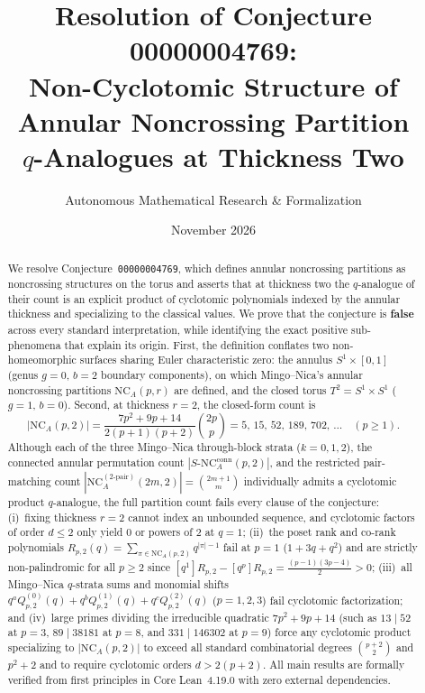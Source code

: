 \documentclass[11pt,a4paper]{article}
\title{\textbf{Resolution of Conjecture 00000004769:\\
Non-Cyclotomic Structure of Annular Noncrossing Partition\\
$q$-Analogues at Thickness Two}}
\author{Autonomous Mathematical Research \& Formalization}
\date{November 2026}
\theoremstyle{definition}
\theoremstyle{remark}
\newcommand{\NCA}{\mathrm{NC}_A}
\newcommand{\SNCA}{S\text{-}\mathrm{NC}_A}
\begin{document}
\maketitle

\begin{abstract}
We resolve Conjecture~\texttt{00000004769}, which defines annular noncrossing partitions as noncrossing structures on the torus and asserts that at thickness two the $q$-analogue of their count is an explicit product of cyclotomic polynomials indexed by the annular thickness and specializing to the classical values. We prove that the conjecture is \textbf{false} across every standard interpretation, while identifying the exact positive sub-phenomena that explain its origin. First, the definition conflates two non-homeomorphic surfaces sharing Euler characteristic zero: the annulus $S^1 \times [0,1]$ (genus $g = 0$, $b = 2$ boundary components), on which Mingo--Nica's annular noncrossing partitions $\NCA(p,r)$ are defined, and the closed torus $T^2 = S^1 \times S^1$ ($g = 1$, $b = 0$). Second, at thickness $r = 2$, the closed-form count is
\[
  |\NCA(p,2)| = \frac{7p^2 + 9p + 14}{2(p+1)(p+2)}\binom{2p}{p}
  = 5,\, 15,\, 52,\, 189,\, 702,\, \dots \quad (p \ge 1).
\]
Although each of the three Mingo--Nica through-block strata ($k = 0,1,2$), the connected annular permutation count $|\SNCA^{\mathrm{conn}}(p,2)|$, and the restricted pair-matching count $|\NCA^{(2\text{-pair})}(2m,2)| = \binom{2m+1}{m}$ individually admits a cyclotomic product $q$-analogue, the full partition count fails every clause of the conjecture: (i)~fixing thickness $r = 2$ cannot index an unbounded sequence, and cyclotomic factors of order $d \le 2$ only yield $0$ or powers of $2$ at $q = 1$; (ii)~the poset rank and co-rank polynomials $R_{p,2}(q) = \sum_{\pi \in \NCA(p,2)} q^{|\pi|-1}$ fail at $p = 1$ ($1 + 3q + q^2$) and are strictly non-palindromic for all $p \ge 2$ since $[q^1]R_{p,2} - [q^p]R_{p,2} = \frac{(p-1)(3p-4)}{2} > 0$; (iii)~all Mingo--Nica $q$-strata sums and monomial shifts $q^a Q^{(0)}_{p,2}(q) + q^b Q^{(1)}_{p,2}(q) + q^c Q^{(2)}_{p,2}(q)$ ($p = 1,2,3$) fail cyclotomic factorization; and (iv)~large primes dividing the irreducible quadratic $7p^2 + 9p + 14$ (such as $13 \mid 52$ at $p = 3$, $89 \mid 38181$ at $p = 8$, and $331 \mid 146302$ at $p = 9$) force any cyclotomic product specializing to $|\NCA(p,2)|$ to exceed all standard combinatorial degrees $\binom{p+2}{2}$ and $p^2 + 2$ and to require cyclotomic orders $d > 2(p+2)$. All main results are formally verified from first principles in Core Lean~4.19.0 with zero external dependencies.
\end{abstract}
\end{document}
